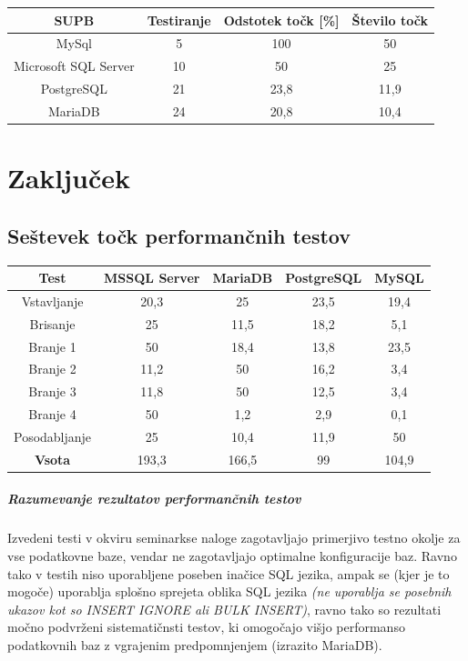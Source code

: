 \documentclass[a4paper,11pt]{report}
\begin{document}
\begin{center}
   \begin{tabular}{||c|c|c|c||}
      \hline
      \textbf{SUPB} & \textbf{Testiranje} & \textbf{Odstotek točk [\%]} & \textbf{Število točk}\\
      \hline
      \hline
      MySql & 5 & 100 & 50 \\
      Microsoft SQL Server & 10 & 50 & 25 \\
      PostgreSQL & 21 & 23,8 & 11,9\\
      MariaDB & 24 & 20,8 & 10,4 \\
      \hline
   \end{tabular}
\end{center}

\chapter{Zaključek}

\section{Seštevek točk performančnih testov}

\begin{center}
   \begin{tabular}{||c|c|c|c|c||}
      \hline
      \textbf{Test} & \textbf{MSSQL Server} & \textbf{MariaDB} & \textbf{PostgreSQL} & \textbf{MySQL}\\
      \hline
      \hline
      Vstavljanje & 20,3 & 25 & 23,5 & 19,4\\
      Brisanje & 25 & 11,5 & 18,2 & 5,1\\
      Branje 1 & 50 & 18,4 & 13,8 & 23,5\\
      Branje 2 & 11,2 & 50 & 16,2 & 3,4\\
      Branje 3 & 11,8 & 50 & 12,5 & 3,4\\
      Branje 4 & 50 & 1,2 & 2,9 & 0,1\\
      Posodabljanje & 25 & 10,4 & 11,9 & 50\\
      \hline
      \hline
      \textbf{Vsota} & 193,3 & 166,5 & 99 & 104,9\\
      \hline
   \end{tabular}
\end{center}

\paragraph{Razumevanje rezultatov performančnih testov}
Izvedeni testi v okviru seminarkse naloge zagotavljajo primerjivo testno okolje za vse podatkovne baze,
vendar ne zagotavljajo optimalne konfiguracije baz. Ravno tako v testih niso uporabljene poseben inačice SQL jezika,
ampak se (kjer je to mogoče) uporablja splošno sprejeta oblika SQL jezika \textit{(ne uporablja se posebnih ukazov kot so INSERT IGNORE ali BULK INSERT)},
ravno tako so rezultati močno podvrženi sistematičnsti testov, ki omogočajo višjo performanso podatkovnih baz z vgrajenim predpomnjenjem (izrazito MariaDB).
\end{document}

